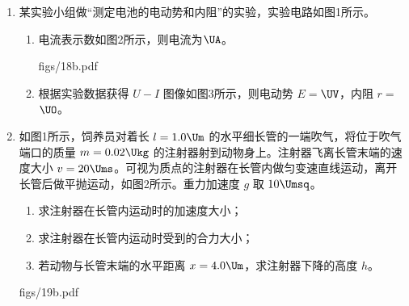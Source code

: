 \documentclass[\gkver]{gaokaozhenti}
\begin{document}
\begin{enumerate}
{（2）用打点计时器测速度不需要测量质量；探究加速度与力、质量的关系的实验需要测量质量、时间和位移，故 B 正确。
}

\item
某实验小组做“测定电池的电动势和内阻”的实验，实验电路如图1所示。
\begin{enumerate}
	\item
	电流表示数如图2所示，则电流为$\UA$。

	{figs/18b.pdf}

	\item
	根据实验数据获得 $U-I$ 图像如图3所示，则电动势 $E=$$\UV$，内阻 $r=$$\UO$。

\end{enumerate}

\item
如图1所示，饲养员对着长 $l=1.0\Um$ 的水平细长管的一端吹气，将位于吹气端口的质量 $m=0.02\Ukg$ 的注射器射到动物身上。注射器飞离长管末端的速度大小 $v=20\Ums$。可视为质点的注射器在长管内做匀变速直线运动，离开长管后做平抛运动，如图2所示。重力加速度 $g$ 取 $10\Umsq$。
\begin{enumerate}
	\item
	求注射器在长管内运动时的加速度大小；
	\item
	求注射器在长管内运动时受到的合力大小；
	\item
	若动物与长管末端的水平距离 $x=4.0\Um$，求注射器下降的高度 $h$。
\end{enumerate}
{figs/19b.pdf}
\end{enumerate}
\end{document}
